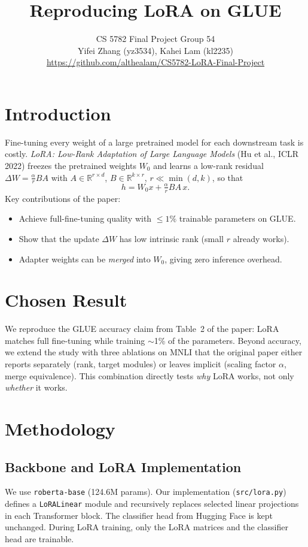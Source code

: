\documentclass[11pt]{article}
\title{\vspace{-2em}\textbf{Reproducing LoRA on GLUE}}
\author{CS 5782 Final Project Group 54\\ Yifei Zhang (yz3534), Kahei Lam (kl2235)\\\small\url{https://github.com/althealam/CS5782-LoRA-Final-Project}}
\date{\vspace{-1em}}
\begin{document}
\maketitle
\vspace{-1.5em}

\section{Introduction}
Fine-tuning every weight of a large pretrained model for each downstream task is costly. \textit{LoRA: Low-Rank Adaptation of Large Language Models} (Hu et al., ICLR 2022) \cite{hu2022lora} freezes the pretrained weights $W_0$ and learns a low-rank residual $\Delta W = \tfrac{\alpha}{r}BA$ with $A \in \mathbb{R}^{r\times d}$, $B \in \mathbb{R}^{k\times r}$, $r \ll \min(d,k)$, so that
\[
h = W_0 x + \tfrac{\alpha}{r} BA\, x.
\]
Key contributions of the paper:
\begin{itemize}\setlength\itemsep{0pt}
  \item Achieve full-fine-tuning quality with $\le 1\%$ trainable parameters on GLUE.
  \item Show that the update $\Delta W$ has low intrinsic rank (small $r$ already works).
  \item Adapter weights can be \emph{merged} into $W_0$, giving zero inference overhead.
\end{itemize}

\section{Chosen Result}
We reproduce the GLUE accuracy claim from Table~2 of the paper: LoRA matches full fine-tuning while training $\sim$1\% of the parameters. Beyond accuracy, we extend the study with three ablations on MNLI that the original paper either reports separately (rank, target modules) or leaves implicit (scaling factor $\alpha$, merge equivalence). This combination directly tests \emph{why} LoRA works, not only \emph{whether} it works.

\section{Methodology}

\subsection{Backbone and LoRA Implementation}
We use \texttt{roberta-base} (124.6M params). Our implementation (\texttt{src/lora.py}) defines a \texttt{LoRALinear} module and recursively replaces selected linear projections in each Transformer block. The classifier head from Hugging Face is kept unchanged. During LoRA training, only the LoRA matrices and the classifier head are trainable.
\end{document}
